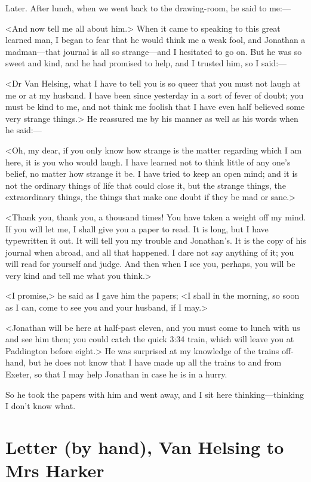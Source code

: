 \begin{diary}{Later.}
After lunch, when we went back to the drawing-room, he said to me:—

<And now tell me all about him.> When it came to speaking to this great learned man, I began to fear that he would think me a weak fool, and Jonathan a madman—that journal is all so strange—and I hesitated to go on. But he was so sweet and kind, and he had promised to help, and I trusted him, so I said:—

<Dr Van Helsing, what I have to tell you is so queer that you must not laugh at me or at my husband. I have been since yesterday in a sort of fever of doubt; you must be kind to me, and not think me foolish that I have even half believed some very strange things.> He reassured me by his manner as well as his words when he said:—

<Oh, my dear, if you only know how strange is the matter regarding which I am here, it is you who would laugh. I have learned not to think little of any one's belief, no matter how strange it be. I have tried to keep an open mind; and it is not the ordinary things of life that could close it, but the strange things, the extraordinary things, the things that make one doubt if they be mad or sane.>

<Thank you, thank you, a thousand times! You have taken a weight off my mind. If you will let me, I shall give you a paper to read. It is long, but I have typewritten it out. It will tell you my trouble and Jonathan's. It is the copy of his journal when abroad, and all that happened. I dare not say anything of it; you will read for yourself and judge. And then when I see you, perhaps, you will be very kind and tell me what you think.>

<I promise,> he said as I gave him the papers; <I shall in the morning, so soon as I can, come to see you and your husband, if I may.>

<Jonathan will be here at half-past eleven, and you must come to lunch with us and see him then; you could catch the quick 3:34 train, which will leave you at Paddington before eight.> He was surprised at my knowledge of the trains off-hand, but he does not know that I have made up all the trains to and from Exeter, so that I may help Jonathan in case he is in a hurry.

So he took the papers with him and went away, and I sit here thinking—thinking I don't know what.
\end{diary}

\section{Letter (by hand), Van Helsing to Mrs Harker}
	
